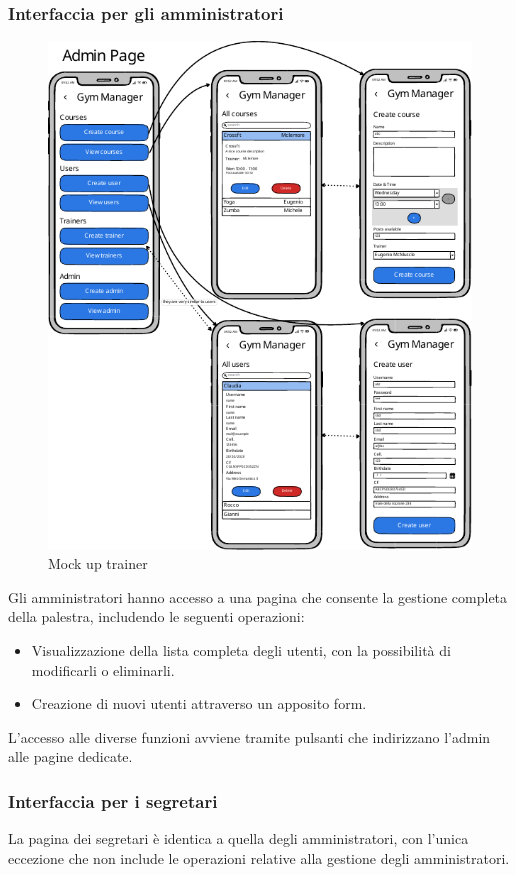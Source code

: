 \documentclass{report}
\begin{document}
\subsubsection{Interfaccia per gli amministratori}
\begin{figure}[h!]
    \centering
    \includegraphics[scale=1]{admin-mockups.pdf}
    \caption{Mock up trainer}
    \label{fig:deathstar}
\end{figure}
\par Gli amministratori hanno accesso a una pagina che consente la gestione completa della palestra, includendo le seguenti operazioni:
\begin{itemize}
    \item Visualizzazione della lista completa degli utenti, con la possibilità di modificarli o eliminarli.
    \item Creazione di nuovi utenti attraverso un apposito form.
\end{itemize}
\par L'accesso alle diverse funzioni avviene tramite pulsanti che indirizzano l'admin alle pagine dedicate.
\subsubsection{Interfaccia per i segretari}
\par La pagina dei segretari è identica a quella degli amministratori, con l'unica eccezione che non include le operazioni relative alla gestione degli amministratori.
\end{document}
